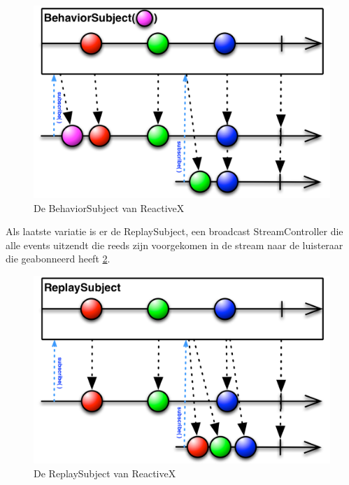 \begin{figure}[H]
    \centering
    \includegraphics[width=\figureWidthModifier\linewidth]{img/stand-van-zaken/rxdart-behaviorsubject.png}
    \caption{De BehaviorSubject van ReactiveX \autocite{Boelens2018}}
    \label{fig:rxdart-behaviorsubject}
\end{figure}

Als laatste variatie is er de ReplaySubject, een broadcast StreamController die alle events uitzendt die reeds zijn voorgekomen in de stream naar de luisteraar die geabonneerd heeft \ref{fig:rxdart-replaysubject}.

\begin{figure}[H]
    \centering
    \includegraphics[width=\figureWidthModifier\linewidth]{img/stand-van-zaken/rxdart-replaysubject.png}
    \caption{De ReplaySubject van ReactiveX \autocite{Boelens2018}}
    \label{fig:rxdart-replaysubject}
\end{figure}


